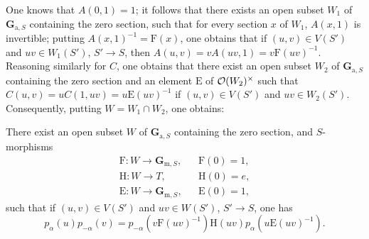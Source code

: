 One knows that $A(0,1)=1$; it follows that there exists an open subset $W_1$ of $\mathbf G_{\mathrm a,S}$ containing the zero section, such that for every section $x$ of $W_1$, $A(x,1)$ is invertible; putting $A(x,1)^{-1}=\mathrm F(x)$, one obtains that if $(u,v)\in V(S')${\renewcommand{\thefootnote}{(11)}} and $uv\in W_1(S')$, $S'\to S$, then $A(u,v)=vA(uv,1)=v\mathrm F(uv)^{-1}$. Reasoning similarly for $C$, one obtains that there exist an open subset $W_2$ of $\mathbf G_{\mathrm a,S}$ containing the zero section and an element $\mathrm E${\renewcommand{\thefootnote}{(12)}} of $\mathcal{O}(W_2)^\times$ such that $C(u,v)=uC(1,uv)=u\mathrm E(uv)^{-1}$ if $(u,v)\in V(S')$ and $uv\in W_2(S')$. Consequently, putting $W=W_1\cap W_2$, one obtains:

There exist an open subset $W$ of $\mathbf G_{\mathrm a,S}$ containing the zero section, and $S$-morphisms
\[
\begin{array}{lll}
\mathrm F:W\to\mathbf G_{\mathrm m,S},&&\mathrm F(0)=1,\\
\mathrm H:W\to T,&&\mathrm H(0)=e,\\
\mathrm E:W\to\mathbf G_{\mathrm m,S},&&\mathrm E(0)=1,
\end{array}
\]
such that if $(u,v)\in V(S')$ and $uv\in W(S')$, $S'\to S$, one has
\begin{equation}\tag{+}\label{XX.eq.plus}
p_\alpha(u)p_{-\alpha}(v)=p_{-\alpha}(v\mathrm F(uv)^{-1})\mathrm H(uv)p_\alpha(u\mathrm E(uv)^{-1}).
\end{equation}

